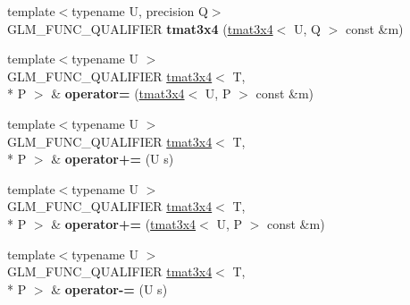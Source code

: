 \begin{DoxyCompactItemize}
\item 
\hypertarget{structglm_1_1detail_1_1tmat3x4_a3ccf735b71ee0db9bbeb1dd33022a761}{{\footnotesize template$<$typename U, precision Q$>$ }\\G\-L\-M\-\_\-\-F\-U\-N\-C\-\_\-\-Q\-U\-A\-L\-I\-F\-I\-E\-R {\bfseries tmat3x4} (\hyperlink{structglm_1_1detail_1_1tmat3x4}{tmat3x4}$<$ U, Q $>$ const \&m)}\label{structglm_1_1detail_1_1tmat3x4_a3ccf735b71ee0db9bbeb1dd33022a761}

\item 
\hypertarget{structglm_1_1detail_1_1tmat3x4_aca5ba516f89ecc2713770dccad41578b}{{\footnotesize template$<$typename U $>$ }\\G\-L\-M\-\_\-\-F\-U\-N\-C\-\_\-\-Q\-U\-A\-L\-I\-F\-I\-E\-R \hyperlink{structglm_1_1detail_1_1tmat3x4}{tmat3x4}$<$ T, \\*
P $>$ \& {\bfseries operator=} (\hyperlink{structglm_1_1detail_1_1tmat3x4}{tmat3x4}$<$ U, P $>$ const \&m)}\label{structglm_1_1detail_1_1tmat3x4_aca5ba516f89ecc2713770dccad41578b}

\item 
\hypertarget{structglm_1_1detail_1_1tmat3x4_a3019cac6fe66503e9e8d45f7c1485b20}{{\footnotesize template$<$typename U $>$ }\\G\-L\-M\-\_\-\-F\-U\-N\-C\-\_\-\-Q\-U\-A\-L\-I\-F\-I\-E\-R \hyperlink{structglm_1_1detail_1_1tmat3x4}{tmat3x4}$<$ T, \\*
P $>$ \& {\bfseries operator+=} (U s)}\label{structglm_1_1detail_1_1tmat3x4_a3019cac6fe66503e9e8d45f7c1485b20}

\item 
\hypertarget{structglm_1_1detail_1_1tmat3x4_a9c28e24ea115b67e1901be600e1acac3}{{\footnotesize template$<$typename U $>$ }\\G\-L\-M\-\_\-\-F\-U\-N\-C\-\_\-\-Q\-U\-A\-L\-I\-F\-I\-E\-R \hyperlink{structglm_1_1detail_1_1tmat3x4}{tmat3x4}$<$ T, \\*
P $>$ \& {\bfseries operator+=} (\hyperlink{structglm_1_1detail_1_1tmat3x4}{tmat3x4}$<$ U, P $>$ const \&m)}\label{structglm_1_1detail_1_1tmat3x4_a9c28e24ea115b67e1901be600e1acac3}

\item 
\hypertarget{structglm_1_1detail_1_1tmat3x4_a8803004a4da174ad2953f76aa6fb3aa5}{{\footnotesize template$<$typename U $>$ }\\G\-L\-M\-\_\-\-F\-U\-N\-C\-\_\-\-Q\-U\-A\-L\-I\-F\-I\-E\-R \hyperlink{structglm_1_1detail_1_1tmat3x4}{tmat3x4}$<$ T, \\*
P $>$ \& {\bfseries operator-\/=} (U s)}\label{structglm_1_1detail_1_1tmat3x4_a8803004a4da174ad2953f76aa6fb3aa5}


\end{DoxyCompactItemize}
